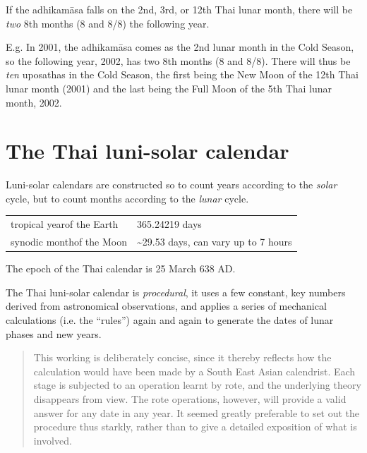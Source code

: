 \documentclass[11pt,oneside]{memoir-article}
\begin{document}
If the adhikamāsa falls on the 2nd, 3rd, or 12th Thai lunar month,
there will be \emph{two} 8th months (8 and 8/8) the following year.

E.g. In 2001, the adhikamāsa comes as the 2nd lunar month in the
Cold Season, so the following year, 2002, has two 8th months (8 and
8/8). There will thus be \emph{ten} uposathas in the Cold Season, the
first being the New Moon of the 12th Thai lunar month (2001) and the
last being the Full Moon of the 5th Thai lunar month, 2002.

\clearpage

\chapter{The Thai luni-solar calendar}
\label{sec-3}

Luni-solar calendars are constructed so to count years according to
the \emph{solar} cycle, but to count months according to the \emph{lunar} cycle.

\begin{center}
\begin{tabular}{ll}
tropical year\footnotemark of the Earth & 365.24219 days\\
synodic month\footnotemark of the Moon & \textasciitilde{}29.53 days, can vary up to 7 hours\\
\end{tabular}
\end{center}

The epoch of the Thai calendar is 25 March 638 AD.

The Thai luni-solar calendar is \emph{procedural}, it uses a few constant,
key numbers derived from astronomical observations, and applies a
series of mechanical calculations (i.e. the ``rules'') again and again
to generate the dates of lunar phases and new years.

\begin{quote}
This working is deliberately concise, since it thereby reflects how
the calculation would have been made by a South East Asian calendrist.
Each stage is subjected to an operation learnt by rote, and the
underlying theory disappears from view. The rote operations, however,
will provide a valid answer for any date in any year. It seemed
greatly preferable to set out the procedure thus starkly, rather than
to give a detailed exposition of what is involved.\cite{eade-interpolation}
\end{quote}
\end{document}
